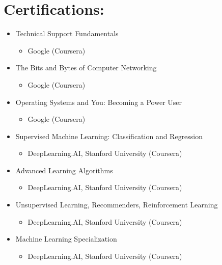 \documentclass[12pt, oneside, a4paper]{article}
\begin{document}
    \section*{Certifications:}
    \begin{itemize}
    \scriptsize
    \item Technical Support Fundamentals 
        \begin{itemize}
            \item Google (Coursera)
        \end{itemize}
    \item The Bits and Bytes of Computer Networking
        \begin{itemize}
            \item Google (Coursera) 
        \end{itemize}
    \item Operating Systems and You: Becoming a Power User
        \begin{itemize}
            \item Google (Coursera) 
        \end{itemize}
    \item Supervised Machine Learning: Classification and Regression
        \begin{itemize}
            \item DeepLearning.AI, Stanford University (Coursera)
        \end{itemize}
    \item Advanced Learning Algorithms
        \begin{itemize}
            \item DeepLearning.AI, Stanford University (Coursera)
        \end{itemize}
    \item Unsupervised Learning, Recommenders, Reinforcement Learning
        \begin{itemize}
            \item DeepLearning.AI, Stanford University (Coursera)
        \end{itemize}
    \item Machine Learning Specialization
        \begin{itemize}
            \item DeepLearning.AI, Stanford University (Coursera)
        \end{itemize}
    \end{itemize}
\end{document}
